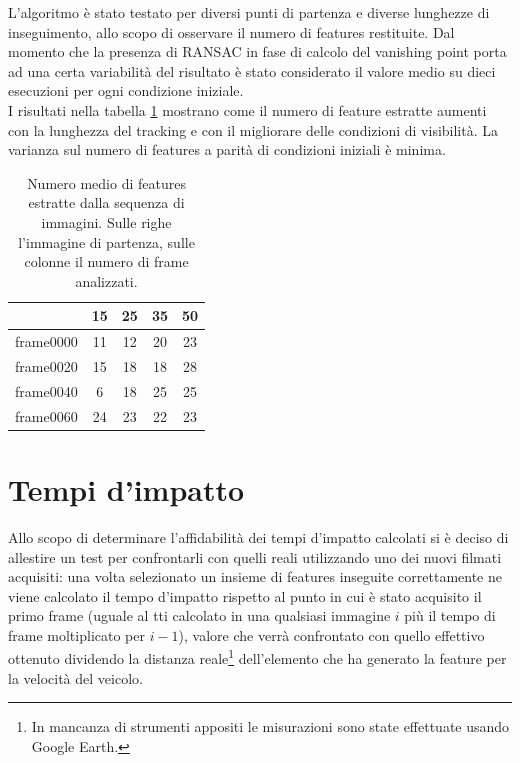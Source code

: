 \documentclass[12pt]{report}
\begin{document}
\noindent L'algoritmo \`e stato testato per diversi punti di partenza e diverse lunghezze di inseguimento, allo scopo di osservare il numero di features restituite. Dal momento che la presenza di RANSAC in fase di calcolo del vanishing point porta ad una certa variabilit\`a del risultato \`e stato considerato il valore medio su dieci esecuzioni per ogni condizione iniziale.\\
\noindent I risultati nella tabella \ref{tabNum} mostrano come il numero di feature estratte aumenti con la lunghezza del tracking e con il migliorare delle condizioni di visibilit\`a. La varianza sul numero di features a parit\`a di condizioni iniziali \`e minima.

\begin{table}[H]
\begin{center}
\begin{tabular}{|c|c|c|c|c|}
	\hline
	& 15 & 25 & 35 & 50 \\
	\hline
	frame0000 & 11 & 12 & 20 & 23\\
	\hline
	frame0020 & 15 & 18 & 18 & 28\\
	\hline
	frame0040 & 6 & 18 & 25 & 25\\
	\hline
	frame0060 & 24 & 23 & 22 & 23\\
	\hline
\end{tabular}
\caption{Numero medio di features estratte dalla sequenza di immagini. Sulle righe l'immagine di partenza, sulle colonne il numero di frame analizzati.}
\label{tabNum}
\end{center}
\end{table}



\newpage
\section{Tempi d'impatto}
\noindent Allo scopo di determinare l'affidabilit\`a dei tempi d'impatto calcolati si \`e deciso di allestire un test per confrontarli con quelli reali utilizzando uno dei nuovi filmati acquisiti: una volta selezionato un insieme di features inseguite correttamente ne viene calcolato il tempo d'impatto rispetto al punto in cui \`e stato acquisito il primo frame (uguale al tti calcolato in una qualsiasi immagine $i$ pi\`u il tempo di frame moltiplicato per $i-1$), valore che verr\`a confrontato con quello effettivo ottenuto dividendo la distanza reale\footnote{In mancanza di strumenti appositi le misurazioni sono state effettuate usando Google Earth.} dell'elemento che ha generato la feature per la velocit\`a del veicolo.\\
\end{document}
